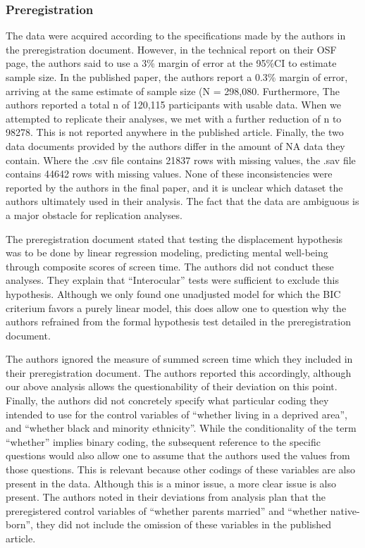 \documentclass[man]{apa6}
\theoremstyle{definition}
\theoremstyle{definition}
\theoremstyle{definition}
\theoremstyle{remark}
\begin{document}
\hypertarget{preregistration}{%
\subsubsection{Preregistration}\label{preregistration}}

The data were acquired according to the specifications made by the
authors in the preregistration document. However, in the technical
report on their OSF page, the authors said to use a 3\% margin of error
at the 95\%CI to estimate sample size. In the published paper, the
authors report a 0.3\% margin of error, arriving at the same estimate of
sample size (N = 298,080. Furthermore, The authors reported a total n of
120,115 participants with usable data. When we attempted to replicate
their analyses, we met with a further reduction of n to 98278. This is
not reported anywhere in the published article. Finally, the two data
documents provided by the authors differ in the amount of NA data they
contain. Where the .csv file contains 21837 rows with missing values,
the .sav file contains 44642 rows with missing values. None of these
inconsistencies were reported by the authors in the final paper, and it
is unclear which dataset the authors ultimately used in their analysis.
The fact that the data are ambiguous is a major obstacle for replication
analyses.

The preregistration document stated that testing the displacement
hypothesis was to be done by linear regression modeling, predicting
mental well-being through composite scores of screen time. The authors
did not conduct these analyses. They explain that \enquote{Interocular}
tests were sufficient to exclude this hypothesis. Although we only found
one unadjusted model for which the BIC criterium favors a purely linear
model, this does allow one to question why the authors refrained from
the formal hypothesis test detailed in the preregistration document.

The authors ignored the measure of summed screen time which they
included in their preregistration document. The authors reported this
accordingly, although our above analysis allows the questionability of
their deviation on this point. Finally, the authors did not concretely
specify what particular coding they intended to use for the control
variables of \enquote{whether living in a deprived area}, and
\enquote{whether black and minority ethnicity}. While the conditionality
of the term \enquote{whether} implies binary coding, the subsequent
reference to the specific questions would also allow one to assume that
the authors used the values from those questions. This is relevant
because other codings of these variables are also present in the data.
Although this is a minor issue, a more clear issue is also present. The
authors noted in their deviations from analysis plan that the
preregistered control variables of \enquote{whether parents married} and
\enquote{whether native-born}, they did not include the omission of
these variables in the published article.
\end{document}
